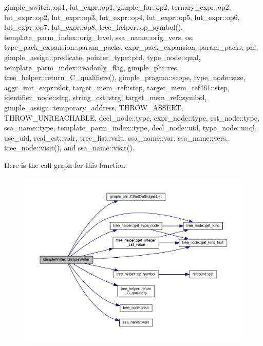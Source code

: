 gimple\+\_\+switch\+::op1, lut\+\_\+expr\+::op1, gimple\+\_\+for\+::op2, ternary\+\_\+expr\+::op2, lut\+\_\+expr\+::op2, lut\+\_\+expr\+::op3, lut\+\_\+expr\+::op4, lut\+\_\+expr\+::op5, lut\+\_\+expr\+::op6, lut\+\_\+expr\+::op7, lut\+\_\+expr\+::op8, tree\+\_\+helper\+::op\+\_\+symbol(), template\+\_\+parm\+\_\+index\+::orig\+\_\+level, ssa\+\_\+name\+::orig\+\_\+vers, os, type\+\_\+pack\+\_\+expansion\+::param\+\_\+packs, expr\+\_\+pack\+\_\+expansion\+::param\+\_\+packs, phi, gimple\+\_\+assign\+::predicate, pointer\+\_\+type\+::ptd, type\+\_\+node\+::qual, template\+\_\+parm\+\_\+index\+::readonly\+\_\+flag, gimple\+\_\+phi\+::res, tree\+\_\+helper\+::return\+\_\+\+C\+\_\+qualifiers(), gimple\+\_\+pragma\+::scope, type\+\_\+node\+::size, aggr\+\_\+init\+\_\+expr\+::slot, target\+\_\+mem\+\_\+ref\+::step, target\+\_\+mem\+\_\+ref461\+::step, identifier\+\_\+node\+::strg, string\+\_\+cst\+::strg, target\+\_\+mem\+\_\+ref\+::symbol, gimple\+\_\+assign\+::temporary\+\_\+address, T\+H\+R\+O\+W\+\_\+\+A\+S\+S\+E\+RT, T\+H\+R\+O\+W\+\_\+\+U\+N\+R\+E\+A\+C\+H\+A\+B\+LE, decl\+\_\+node\+::type, expr\+\_\+node\+::type, cst\+\_\+node\+::type, ssa\+\_\+name\+::type, template\+\_\+parm\+\_\+index\+::type, decl\+\_\+node\+::uid, type\+\_\+node\+::unql, use\+\_\+uid, real\+\_\+cst\+::valr, tree\+\_\+list\+::valu, ssa\+\_\+name\+::var, ssa\+\_\+name\+::vers, tree\+\_\+node\+::visit(), and ssa\+\_\+name\+::visit().

Here is the call graph for this function\+:
\nopagebreak
\begin{figure}[H]
\begin{center}
\leavevmode
\includegraphics[width=350pt]{d5/df9/structGimpleWriter_a1e0507168bb97876b36eb3e7e2d779df_cgraph}
\end{center}
\end{figure}


